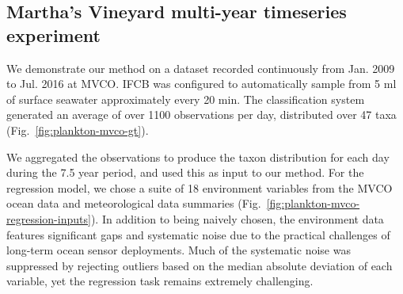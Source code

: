 \subsection{Martha's Vineyard multi-year timeseries experiment}
We demonstrate our method on a dataset recorded continuously from Jan. 2009 to Jul. 2016 at MVCO. IFCB was configured to automatically sample from 5 ml of surface seawater approximately every 20 min. The classification system generated an average of over 1100 observations per day, distributed over 47 taxa (Fig.~\ref{fig:plankton-mvco-gt}).

We aggregated the observations to produce the taxon distribution for each day during the 7.5 year period, and used this as input to our method. For the regression model, we chose a suite of 18 environment variables from the MVCO ocean data and meteorological data summaries (Fig.~\ref{fig:plankton-mvco-regression-inputs}). In addition to being naively chosen, the environment data features significant gaps and systematic noise due to the practical challenges of long-term ocean sensor deployments. Much of the systematic noise was suppressed by rejecting outliers based on the median absolute deviation of each variable, yet the regression task remains extremely challenging.


